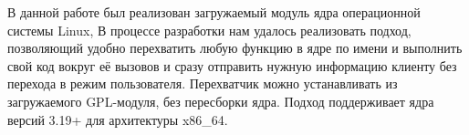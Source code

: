 \Conclusion %

В данной работе был реализован загружаемый модуль ядра операционной системы Linux, В процессе разработки нам удалось реализовать подход, позволяющий удобно перехватить любую функцию в ядре по имени и выполнить свой код вокруг её вызовов и сразу отправить нужную информацию клиенту без перехода в режим пользователя. Перехватчик можно устанавливать из загружаемого GPL-модуля, без пересборки ядра. Подход поддерживает ядра версий 3.19+ для архитектуры x86\_64.

